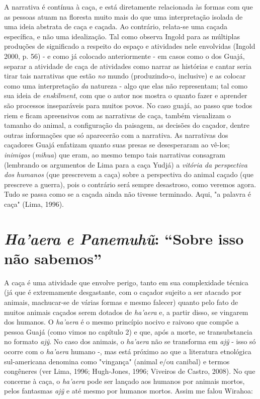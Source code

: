 A narrativa é contínua à caça, e está diretamente relacionada às formas
com que as pessoas atuam na floresta muito mais do que uma interpretação
isolada de uma ideia abstrata de caça e caçada. Ao contrário, relata-se
uma caçada específica, e não uma idealização. Tal como observa Ingold
para as múltiplas produções de significado a respeito do espaço e
atividades nele envolvidas (Ingold 2000, p. 56) - e como já colocado
anteriormente - em casos como o dos Guajá, separar a atividade de caça
de atividades como narrar as histórias e cantar seria tirar tais
narrativas que estão \emph{no} mundo (produzindo-o, inclusive) e as
colocar como uma interpretação \emph{da} natureza - algo que elas não
representam; tal como sua ideia de \emph{enskilment}, com que o autor
nos mostra o quanto fazer e aprender são processos inseparáveis para
muitos povos. No caso guajá, ao passo que todos riem e ficam apreensivos
com as narrativas de caça, também visualizam o tamanho do animal, a
configuração da paisagem, as decisões do caçador, dentre outras
informações que só aparecerão com a narrativa. As narrativas dos
caçadores Guajá enfatizam quanto suas presas se desesperaram ao vê-los;
\emph{inimigos} (\emph{mihua}) que eram, ao mesmo tempo tais narrativas
consagram (lembrando os argumentos de Lima para a caça Yudjá) a
\emph{vitória da perspectiva dos humanos} (que prescrevem a caça) sobre
a perspectiva do animal caçado (que prescreve a guerra), pois o
contrário será sempre desastroso, como veremos agora. Tudo se passa como
se a caçada ainda não tivesse terminado. Aqui, "a palavra é caça" (Lima,
1996).

\section{\emph{Ha'aera e Panemuhũ}: ``Sobre isso não sabemos''}

A caça é uma atividade que envolve perigo, tanto em sua complexidade
técnica (já que é extremamente desgastante, com o caçador sujeito a ser
atacado por animais, machucar-se de várias formas e mesmo falecer)
quanto pelo fato de muitos animais caçados serem dotados de
\emph{ha'aera} e, a partir disso, se vingarem dos humanos. O
\emph{ha'aera} é o mesmo princípio nocivo e raivoso que compõe a pessoa
Guajá (como vimos no capítulo 2) e que, após a morte, se transubstancia
no formato \emph{ajỹ}. No caso dos animais, o \emph{ha'aera} não se
transforma em \emph{ajỹ} - isso só ocorre com o \emph{ha'aera} humano -,
mas está próximo ao que a literatura etnológica sul-americana denomina
como "vingança" (animal e/ou canibal) e termos congêneres (ver Lima,
1996; Hugh-Jones, 1996; Viveiros de Castro, 2008). No que concerne à
caça, o \emph{ha'aera} pode ser lançado aos humanos por animais mortos,
pelos fantasmas \emph{ajỹ} e até mesmo por humanos mortos. Assim me
falou Wirahoa:

